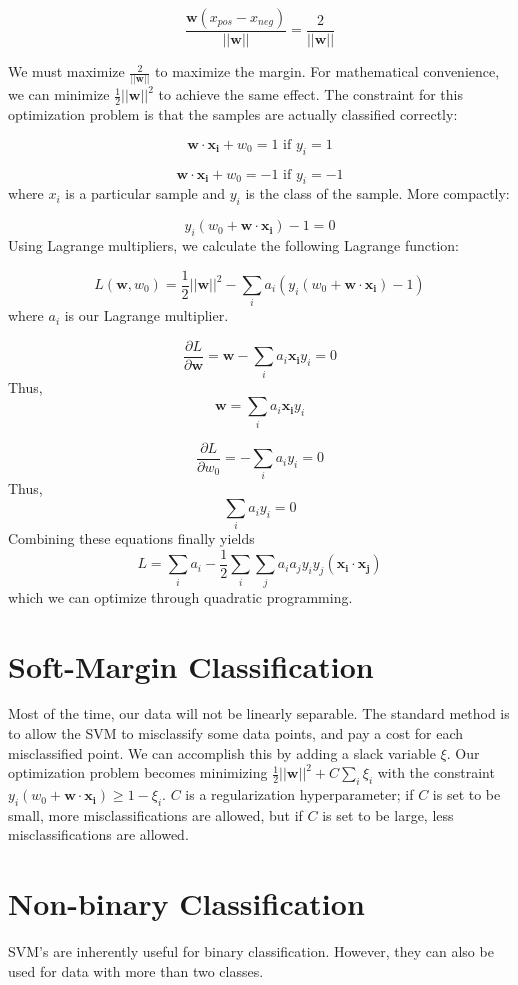 \documentclass{article}
\begin{document}
\[ \frac{\bm{w}(x_{pos} - x_{neg})}{||\bm{w}||} = \frac{2}{||\bm{w}||} \]

We must maximize $\frac{2}{||\bm{w}||}$ to maximize the margin. For mathematical convenience, we can minimize $\frac{1}{2}{||\bm{w}||^2}$ to achieve the same effect. The constraint for this optimization problem is that the samples are actually classified correctly:

\[ \bm{w \cdot x_{i}} + w_0 = 1 \text{ if $y_i = 1$} \]

\[ \bm{w \cdot x_{i}} + w_0 = -1 \text{ if $y_i = -1$}\]
where $x_i$ is a particular sample and $y_i$ is the class of the sample. More compactly:

\[ y_i(w_0 + \bm{w \cdot x_i}) - 1 = 0 \]
Using Lagrange multipliers, we  calculate the following Lagrange function:

\[ L(\bm{w}, w_0) = \frac{1}{2}{||\bm{w}||^2} - \sum_i{a_i(y_i(w_0 + \bm{w \cdot x_i}) - 1)}\]
where $a_i$ is our Lagrange multiplier.

\[ \frac{\partial L}{\partial \bm{w}} = \bm{w} - \sum_i{{a_i}{\bm{x_i}}{y_i}} = 0\]
Thus, 
\[ \bm{w} = \sum_i{{a_i}{\bm{x_i}}{y_i}} \]

\[ \frac{\partial L}{\partial w_0} = -\sum_i{{a_i}{y_i}} = 0\]
Thus,
\[ \sum_i{{a_i}{y_i}} = 0 \]
Combining these equations finally yields
\[ L = \sum_i{a_i}  - \frac{1}{2}{\sum_i{\sum_j{{a_i}{a_j}{y_i}{y_j}{(\bm{x_i \cdot x_j})}}}} \]
which we can optimize through quadratic programming.

\section{Soft-Margin Classification}
Most of the time, our data will not be linearly separable. The standard method is to allow the SVM to misclassify some data points, and pay a cost for each misclassified point. We can accomplish this by adding a slack variable $\xi$. Our optimization problem becomes minimizing $\frac{1}{2}{||\bm{w}||^2} + C\sum_i{{{\xi}_i}}$ with the constraint $y_i(w_0 + \bm{w \cdot x_i}) \geq 1 - {\xi}_i$. $C$ is a regularization hyperparameter; if $C$ is set to be small, more misclassifications are allowed, but if $C$ is set to be large, less misclassifications are allowed. 

\section{Non-binary Classification}

SVM's are inherently useful for binary classification. However, they can also be used for data with more than two classes.
\end{document}
